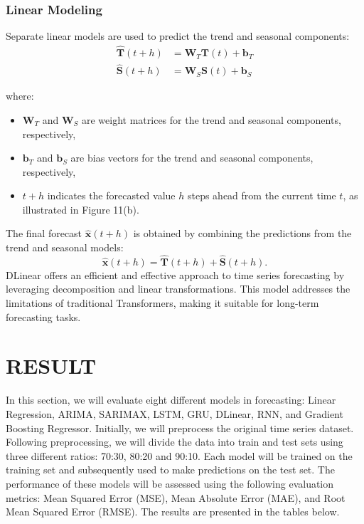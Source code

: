 \documentclass{ieeeojies}
\begin{document}
\subsubsection{Linear Modeling}
Separate linear models are used to predict the trend and seasonal components:
\begin{align}
    \hat{\mathbf{T}}(t+h) & = \mathbf{W}_T \mathbf{T}(t) + \mathbf{b}_T \\
    \hat{\mathbf{S}}(t+h) & = \mathbf{W}_S \mathbf{S}(t) + \mathbf{b}_S
\end{align}

where:
\begin{itemize}
    \item $\mathbf{W}_T$ and $\mathbf{W}_S$ are weight matrices for the trend and seasonal components, respectively,
    \item $\mathbf{b}_T$ and $\mathbf{b}_S$ are bias vectors for the trend and seasonal components, respectively,
    \item $t+h$ indicates the forecasted value $h$ steps ahead from the current time $t$, as illustrated in Figure 11(b).
\end{itemize}

The final forecast \( \hat{\mathbf{x}}(t+h) \) is obtained by combining the predictions from the trend and seasonal models:
\begin{equation}
    \hat{\mathbf{x}}(t+h) = \hat{\mathbf{T}}(t+h) + \hat{\mathbf{S}}(t+h).
\end{equation}
DLinear offers an efficient and effective approach to time series forecasting by leveraging decomposition and linear transformations. This model addresses the limitations of traditional Transformers, making it suitable for long-term forecasting tasks.
\section{RESULT}
In this section, we will evaluate eight different models in forecasting: Linear Regression, ARIMA, SARIMAX, LSTM, GRU, DLinear, RNN, and Gradient Boosting Regressor. Initially, we will preprocess the original time series dataset. Following preprocessing, we will divide the data into train and test sets using three different ratios: 70:30, 80:20 and 90:10. Each model will be trained on the training set and subsequently used to make predictions on the test set. The performance of these models will be assessed using the following evaluation metrics: Mean Squared Error (MSE), Mean Absolute Error (MAE), and Root Mean Squared Error (RMSE). The results are presented in the tables below.
\end{document}
